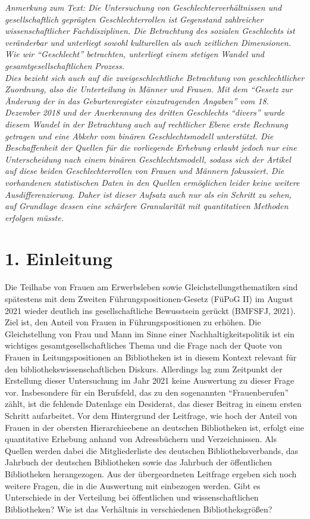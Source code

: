 \documentclass[a4paper,
fontsize=11pt,
oneside,
numbers=noperiodatend,
parskip=half-,
bibliography=totoc,
final
]{scrartcl}
\begin{document}

\emph{Anmerkung zum Text: Die Untersuchung von Geschlechterverhältnissen und gesellschaftlich geprägten Geschlechterrollen ist Gegenstand zahlreicher wissenschaftlicher Fachdisziplinen. Die Betrachtung des sozialen Geschlechts ist veränderbar und unterliegt sowohl kulturellen als auch zeitlichen Dimensionen. Wie wir \enquote{Geschlecht} betrachten, unterliegt einem stetigen Wandel und gesamtgesellschaftlichen Prozess. \\
Dies bezieht sich auch auf die zweigeschlechtliche Betrachtung von geschlechtlicher Zuordnung, also die Unterteilung in Männer und Frauen. Mit dem \enquote{Gesetz zur Änderung der in das Geburtenregister einzutragenden Angaben} vom 18. Dezember 2018 und der Anerkennung des dritten Geschlechts \enquote{divers} wurde diesem Wandel in der Betrachtung auch auf rechtlicher Ebene erste Rechnung getragen und eine Abkehr vom binären Geschlechtsmodell unterstützt. Die Beschaffenheit der Quellen für die vorliegende Erhebung erlaubt jedoch nur eine Unterscheidung nach einem binären Geschlechtsmodell, sodass sich der Artikel auf diese beiden Geschlechterrollen von Frauen und Männern fokussiert. Die vorhandenen statistischen Daten in den Quellen ermöglichen leider keine weitere Ausdifferenzierung. Daher ist dieser Aufsatz auch nur als ein Schritt zu sehen, auf Grundlage dessen eine schärfere Granularität mit quantitativen Methoden erfolgen müsste.}

\hypertarget{einleitung}{%
\section{1. Einleitung}\label{einleitung}}

Die Teilhabe von Frauen am Erwerbsleben sowie Gleichstellungsthematiken
sind spätestens mit dem Zweiten Führungspositionen-Gesetz (FüPoG II) im
August 2021 wieder deutlich ins gesellschaftliche Bewusstsein gerückt
(BMFSFJ, 2021). Ziel ist, den Anteil von Frauen in Führungspositionen zu
erhöhen. Die Gleichstellung von Frau und Mann im Sinne einer
Nachhaltigkeitspolitik ist ein wichtiges gesamtgesellschaftliches Thema
und die Frage nach der Quote von Frauen in Leitungspositionen an
Bibliotheken ist in diesem Kontext relevant für den
bibliothekswissenschaftlichen Diskurs. Allerdings lag zum Zeitpunkt der
Erstellung dieser Untersuchung im Jahr 2021 keine Auswertung zu dieser
Frage vor. Insbesondere für ein Berufsfeld, das zu den sogenannten
\enquote{Frauenberufen} zählt, ist die fehlende Datenlage ein Desiderat,
das dieser Beitrag in einem ersten Schritt aufarbeitet. Vor dem
Hintergrund der Leitfrage, wie hoch der Anteil von Frauen in der
obersten Hierarchieebene an deutschen Bibliotheken ist, erfolgt eine
quantitative Erhebung anhand von Adressbüchern und Verzeichnissen. Als
Quellen werden dabei die Mitgliederliste des deutschen
Bibliotheksverbands, das Jahrbuch der deutschen Bibliotheken sowie das
Jahrbuch der öffentlichen Bibliotheken herangezogen. Aus der
übergeordneten Leitfrage ergeben sich noch weitere Fragen, die in die
Auswertung mit einbezogen werden. Gibt es Unterschiede in der Verteilung
bei öffentlichen und wissenschaftlichen Bibliotheken? Wie ist das
Verhältnis in verschiedenen Bibliotheksgrößen?
\end{document}
